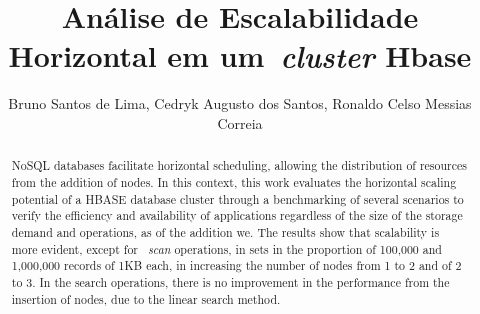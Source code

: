 \documentclass[12pt]{article}
\title{Análise de Escalabilidade Horizontal em um~\emph{cluster}  Hbase}
\author{Bruno Santos de Lima, Cedryk Augusto dos Santos, Ronaldo Celso Messias Correia }
\begin{document}
 

\maketitle


\begin{abstract}
NoSQL databases facilitate horizontal scheduling, allowing the distribution of resources from the addition of nodes. In this context, this work evaluates the horizontal scaling potential of a HBASE database cluster through a benchmarking of several scenarios to verify the efficiency and availability of applications regardless of the size of the storage demand and operations, as of the addition we. The results show that scalability is more evident, except for ~\emph{scan} operations, in sets in the proportion of 100,000 and 1,000,000 records of 1KB each, in increasing the number of nodes from 1 to 2 and of 2 to 3. In the search operations, there is no improvement in the performance from the insertion of nodes, due to the linear search method.
\end{abstract}
     
\end{document}
